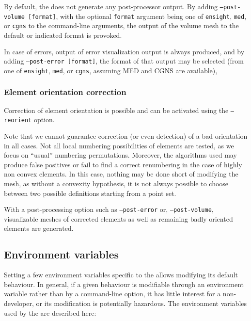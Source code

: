 {{{{By default, the \pcs does not generate any post-processor output.
By adding \texttt{--post-volume [format]},
with the optional \texttt{format} argument being one of \texttt{ensight},
\texttt{med}, or \texttt{cgns} to the command-line arguments,
the output of the volume mesh to the default or indicated format
is provoked.

In case of errors, output of error visualization output is always
produced, and by adding \texttt{--post-error [format]},
the format of that output may be selected (from one of \texttt{ensight},
\texttt{med}, or \texttt{cgns}, assuming MED and CGNS are
available),

\subsubsection{Element orientation correction\label{sec:optpcs:orient}}

Correction of element orientation is possible and can be activated using the
\texttt{--reorient} option.

Note that we cannot guarantee correction (or even detection) of a bad
orientation in all cases.
Not all local numbering possibilities of elements are tested,
as we focus on ``usual'' numbering permutations. Moreover,
the algorithms used may produce false positives or fail to find
a correct renumbering in the case of highly non convex elements.
In this case, nothing may be done short of modifying the mesh, as
without a convexity hypothesis, it is not always possible to choose
between two possible definitions starting from a point set.

With a post-processing option such as \texttt{--post-error}
or, \texttt{--post-volume},
visualizable meshes of corrected elements as well as remaining
badly oriented elements are generated.

\subsection{Environment variables\label{sec:envvpcs}}

Setting a few environment variables specific to the \pcs allows modifying
its default behaviour. In general, if a given behaviour is modifiable
through an environment variable rather than by a command-line option,
it has little interest for a non-developer, or its modification is
potentially hazardous. The environment variables used by the \pcs
are described here:


}}}}
